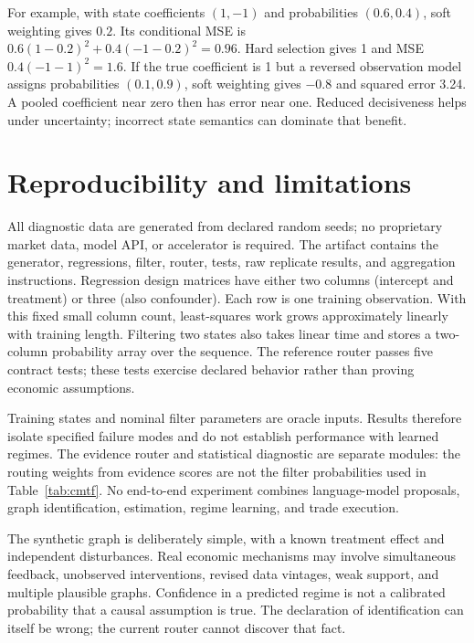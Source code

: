 For example, with state coefficients $(1,-1)$ and probabilities $(0.6,0.4)$, soft weighting gives $0.2$. Its conditional MSE is $0.6(1-0.2)^2+0.4(-1-0.2)^2=0.96$. Hard selection gives 1 and MSE $0.4(-1-1)^2=1.6$. If the true coefficient is 1 but a reversed observation model assigns probabilities $(0.1,0.9)$, soft weighting gives $-0.8$ and squared error 3.24. A pooled coefficient near zero then has error near one. Reduced decisiveness helps under uncertainty; incorrect state semantics can dominate that benefit.

\section{Reproducibility and limitations}
All diagnostic data are generated from declared random seeds; no proprietary market data, model API, or accelerator is required. The artifact contains the generator, regressions, filter, router, tests, raw replicate results, and aggregation instructions. Regression design matrices have either two columns (intercept and treatment) or three (also confounder). Each row is one training observation. With this fixed small column count, least-squares work grows approximately linearly with training length. Filtering two states also takes linear time and stores a two-column probability array over the sequence. The reference router passes five contract tests; these tests exercise declared behavior rather than proving economic assumptions.

Training states and nominal filter parameters are oracle inputs. Results therefore isolate specified failure modes and do not establish performance with learned regimes. The evidence router and statistical diagnostic are separate modules: the routing weights from evidence scores are not the filter probabilities used in Table~\ref{tab:cmtf}. No end-to-end experiment combines language-model proposals, graph identification, estimation, regime learning, and trade execution.

The synthetic graph is deliberately simple, with a known treatment effect and independent disturbances. Real economic mechanisms may involve simultaneous feedback, unobserved interventions, revised data vintages, weak support, and multiple plausible graphs. Confidence in a predicted regime is not a calibrated probability that a causal assumption is true. The declaration of identification can itself be wrong; the current router cannot discover that fact.

